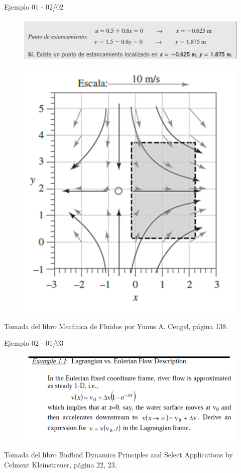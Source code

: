 \begin{frame}{Ejemplo 01 - 02/02}
\justifying
\begin{figure}[H]
\centering
\includegraphics[scale=0.3]{Section_Files/picmanuel/14.png}
\label{fig: Figura2-Fig0403-09}
\end{figure}
\begin{figure}[H]
\centering
\includegraphics[scale=0.3]{Section_Files/picmanuel/15.png}
\label{fig: Figura2-Fig0403-10}
\end{figure}
{\tiny Tomada del libro Mecánica de Fluidos por Yunus A. Cengel, página 138.}
\end{frame}

\begin{frame}{Ejemplo 02 - 01/03}
\justifying
\begin{figure}[H]
\centering
\includegraphics[scale=0.4]{Section_Files/picmanuel/16.png}
\label{fig: Figura2-Fig0403-11}
\end{figure}
{\tiny Tomada del libro Biofluid Dynamics Principles and Select Applications by Celment Kleinstreuer, página 22, 23.}
\end{frame}

